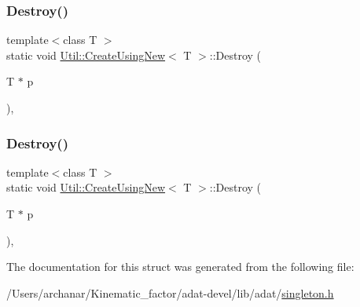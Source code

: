 \mbox{\label{structUtil_1_1CreateUsingNew_a5e4b35ac95cb42c29d2542422ac6d17d}} 
\subsubsection{\texorpdfstring{Destroy()}{Destroy()}\hspace{0.1cm}{\footnotesize\ttfamily [2/3]}}
{\footnotesize\ttfamily template$<$class T $>$ \\
static void \mbox{\hyperlink{structUtil_1_1CreateUsingNew}{Util\+::\+Create\+Using\+New}}$<$ T $>$\+::Destroy (\begin{DoxyParamCaption}\item[{T $\ast$}]{p }\end{DoxyParamCaption})\hspace{0.3cm}{\ttfamily [inline]}, {\ttfamily [static]}}

\mbox{\label{structUtil_1_1CreateUsingNew_a5e4b35ac95cb42c29d2542422ac6d17d}} 
\subsubsection{\texorpdfstring{Destroy()}{Destroy()}\hspace{0.1cm}{\footnotesize\ttfamily [3/3]}}
{\footnotesize\ttfamily template$<$class T $>$ \\
static void \mbox{\hyperlink{structUtil_1_1CreateUsingNew}{Util\+::\+Create\+Using\+New}}$<$ T $>$\+::Destroy (\begin{DoxyParamCaption}\item[{T $\ast$}]{p }\end{DoxyParamCaption})\hspace{0.3cm}{\ttfamily [inline]}, {\ttfamily [static]}}



The documentation for this struct was generated from the following file\+:\begin{DoxyCompactItemize}
\item 
/\+Users/archanar/\+Kinematic\+\_\+factor/adat-\/devel/lib/adat/\mbox{\hyperlink{adat-devel_2lib_2adat_2singleton_8h}{singleton.\+h}}\end{DoxyCompactItemize}
